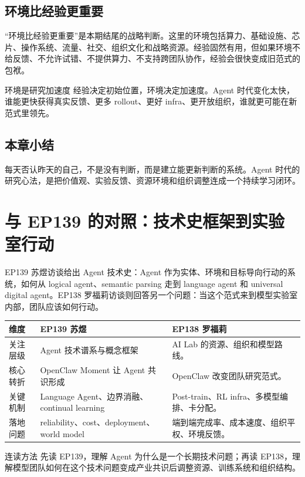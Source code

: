\documentclass[a4paper]{article}
\begin{document}
\subsection{环境比经验更重要}

“环境比经验更重要”是本期结尾的战略判断。这里的环境包括算力、基础设施、芯片、操作系统、流量、社交、组织文化和战略资源。经验固然有用，但如果环境不给反馈、不允许试错、不提供算力、不支持跨团队协作，经验会很快变成旧范式的包袱。

\begin{importantbox}{环境是研究加速度}
经验决定初始位置，环境决定加速度。Agent 时代变化太快，谁能更快获得真实反馈、更多 rollout、更好 infra、更开放组织，谁就更可能在新范式里领先。
\end{importantbox}

\subsection{本章小结}

每天否认昨天的自己，不是没有判断，而是建立能更新判断的系统。Agent 时代的研究心法，是把价值观、实验反馈、资源环境和组织调整连成一个持续学习闭环。

\section{与 EP139 的对照：技术史框架到实验室行动}

EP139 苏煜访谈给出 Agent 技术史：Agent 作为实体、环境和目标导向行动的系统，如何从 logical agent、semantic parsing 走到 language agent 和 universal digital agent。EP138 罗福莉访谈则回答另一个问题：当这个范式来到模型实验室内部，团队应该如何行动。

\noindent\begin{tabularx}{\textwidth}{p{}p{}X}
\toprule
维度 & EP139 苏煜 & EP138 罗福莉 \\
\midrule
关注层级 & Agent 技术谱系与概念框架 & AI Lab 的资源、组织和模型路线。 \\
核心转折 & OpenClaw Moment 让 Agent 共识形成 & OpenClaw 改变团队研究范式。 \\
关键机制 & Language Agent、边界消融、continual learning & Post-train、RL infra、多模型编排、卡分配。 \\
落地问题 & reliability、cost、deployment、world model & 端到端完成率、成本速度、组织平权、环境反馈。 \\
\bottomrule
\end{tabularx}

\begin{knowledgebox}{连读方法}
先读 EP139，理解 Agent 为什么是一个长期技术问题；再读 EP138，理解模型团队如何在这个技术问题变成产业共识后调整资源、训练系统和组织结构。
\end{knowledgebox}
\end{document}
